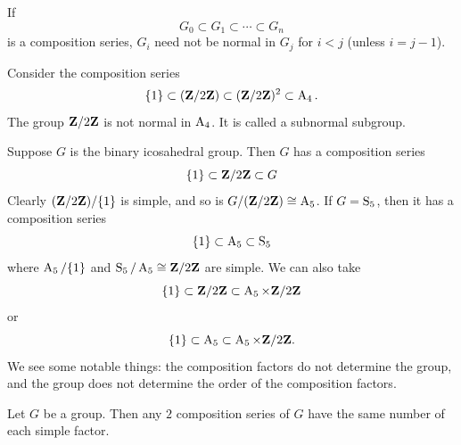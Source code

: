 \documentclass[11pt, oneside]{amsart}
\begin{document}
\begin{warning}
If
$$
G_0 \subset G_1 \subset \cdots\subset G_n 
$$
is a composition series, $G_i$ need not be normal in $G_j$ for $i<j$ (unless $i = j-1$).
\end{warning}
\begin{example}
Consider the composition series
$$
\{1\} \subset (\mathbf Z / 2\mathbf Z) \subset (\mathbf Z / 2\mathbf Z)^2 \subset \operatorname{A}_4.
$$
The group $\mathbf Z / 2\mathbf Z$ is not normal in $\operatorname{A}_4$. It is called a subnormal subgroup.
\end{example}

Suppose $G$ is the binary icosahedral group. Then $G$ has a composition series
$$
\{1\} \subset \mathbf Z / 2\mathbf Z \subset G
$$
Clearly $(\mathbf Z / 2\mathbf Z) / \{1\}$ is simple, and so is $G/(\mathbf Z / 2\mathbf Z) \cong \operatorname{A}_5$. If $G =\operatorname{S}_5$, then it has a composition series
$$
\{1\} \subset \operatorname{A}_5 \subset \operatorname{S}_5
$$
where $\operatorname{A}_5/\{1\}$ and $\operatorname{S}_5 /\operatorname{A}_5 \cong \mathbf Z / 2\mathbf Z$ are simple. We can also take 
$$
\{1\} \subset \mathbf Z / 2\mathbf Z \subset \operatorname{A}_5\times\mathbf Z / 2\mathbf Z
$$
or 
$$
\{1\} \subset \operatorname{A}_5 \subset\operatorname{A}_5\times \mathbf Z / 2\mathbf Z.
$$
We see some notable things: the composition factors do not determine the group, and the group does not determine the order of the composition factors. 
\begin{theorem} \label{jh}
Let $G$ be a group. Then any $2$ composition series of $G$ have the same number of each simple factor.
\end{theorem}
\end{document}
